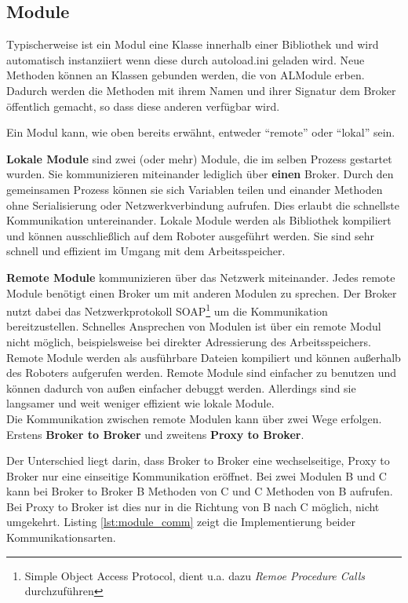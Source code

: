 \subsection{Module}
Typischerweise ist ein Modul eine Klasse innerhalb einer Bibliothek und wird automatisch instanziiert wenn diese  durch \textsf{autoload.ini} geladen wird. Neue Methoden können an Klassen gebunden werden, die von \textsf{ALModule} erben. Dadurch werden die Methoden mit ihrem Namen und ihrer Signatur dem Broker öffentlich gemacht, so dass diese anderen verfügbar wird.

Ein Modul kann, wie oben bereits erwähnt, entweder "`remote"' oder "`lokal"' sein. 

\textbf{Lokale Module } sind zwei (oder mehr) Module, die im selben Prozess gestartet wurden. Sie kommunizieren miteinander lediglich über \textbf{einen} Broker. Durch den gemeinsamen Prozess können sie sich  Variablen teilen und einander Methoden ohne Serialisierung oder Netzwerkverbindung aufrufen. Dies erlaubt die schnellste Kommunikation untereinander. Lokale Module werden als Bibliothek kompiliert und können ausschließlich auf dem Roboter ausgeführt werden. Sie sind sehr schnell und effizient im Umgang mit dem Arbeitsspeicher.

\textbf{Remote Module} kommunizieren über das Netzwerk miteinander. Jedes remote Module benötigt einen Broker um mit anderen Modulen zu sprechen. Der Broker nutzt dabei das Netzwerkprotokoll SOAP\footnote{Simple Object Access Protocol, dient u.a. dazu \textit{Remoe Procedure Calls} durchzuführen} um die Kommunikation bereitzustellen. Schnelles Ansprechen von Modulen ist über ein remote Modul nicht möglich, beispielsweise bei direkter Adressierung des Arbeitsspeichers. Remote Module werden als ausführbare Dateien kompiliert und können außerhalb des Roboters aufgerufen werden. Remote Module sind einfacher zu benutzen und können dadurch von außen einfacher debuggt werden. Allerdings sind sie langsamer und weit weniger effizient wie lokale Module. 
\\
Die Kommunikation zwischen remote Modulen kann über zwei Wege erfolgen. Erstens \textbf{Broker to Broker} und zweitens \textbf{Proxy to Broker}.
 
Der Unterschied liegt darin, dass Broker to Broker eine wechselseitige, Proxy to Broker nur eine einseitige Kommunikation eröffnet. Bei zwei Modulen B und C kann bei Broker to Broker B Methoden von C und C Methoden von B aufrufen. Bei Proxy to Broker ist dies nur in die Richtung von B nach C möglich, nicht umgekehrt. Listing \ref{lst:module_comm} zeigt die Implementierung beider Kommunikationsarten.

